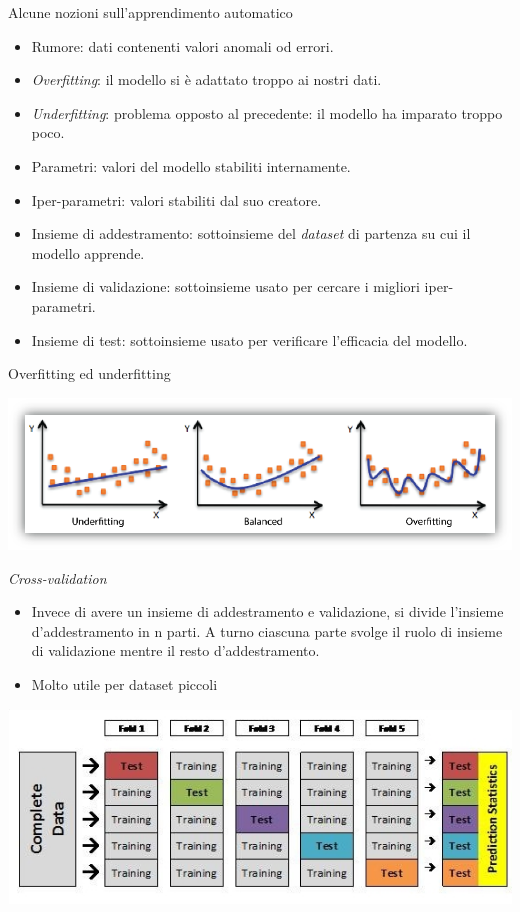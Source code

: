 \documentclass[11pt]{beamer}
\begin{document}
	\begin{frame}{Alcune nozioni sull'apprendimento automatico}
		\begin{itemize}
			\item Rumore: dati contenenti valori anomali od errori.
			\item \textit{Overfitting}: il modello si \`e adattato troppo ai nostri dati.
			\item \textit{Underfitting}: problema opposto al precedente: il modello ha imparato troppo poco.
			\item Parametri: valori del modello stabiliti internamente.
			\item Iper-parametri: valori stabiliti dal suo creatore.
			\item Insieme di addestramento: sottoinsieme del \textit{dataset} di partenza su cui il modello apprende.
			\item Insieme di validazione: sottoinsieme usato per cercare i migliori iper-parametri.
			\item Insieme di test: sottoinsieme usato per verificare l'efficacia del modello.
		\end{itemize}
	\end{frame}
	\begin{frame}{Overfitting ed underfitting}
		\begin{center}
			\centering
			\includegraphics[width=1.1\linewidth]{img/underfittingoverfitting}
		\end{center}
	\end{frame}
	\begin{frame}{\textit{Cross-validation}}
		\begin{itemize}
			\item Invece di avere un insieme di addestramento e validazione, si divide l'insieme d'addestramento in n parti. A turno ciascuna parte svolge il ruolo di insieme di validazione mentre il resto d'addestramento.
			\item Molto utile per dataset piccoli
		\end{itemize}
		\includegraphics[width=0.7\linewidth]{img/crossvalidation}
	\end{frame}
\end{document}

